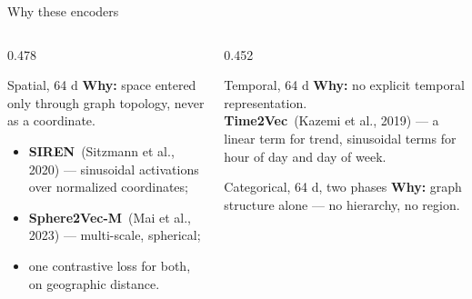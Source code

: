 \documentclass{beamer}
\begin{document}
\begin{frame}{Why these encoders}
    \begin{columns}[T,onlytextwidth]
        \begin{column}{0.478\textwidth}
            \begin{block}{Spatial, 64 d}
                \footnotesize
                \textbf{Why:} space entered only through graph topology, never as a coordinate.
                \begin{itemize}\setlength{\itemsep}{3pt}
                    \item \textbf{SIREN}~{\scriptsize(Sitzmann et al., 2020)} --- sinusoidal activations over normalized coordinates;
                    \item \textbf{Sphere2Vec-M}~{\scriptsize(Mai et al., 2023)} --- multi-scale, spherical;
                    \item one contrastive loss for both, on geographic distance.
                \end{itemize}
            \end{block}
        \end{column}
        \hfill
        \begin{column}{0.452\textwidth}
            \begin{block}{Temporal, 64 d}
                \footnotesize
                \textbf{Why:} no explicit temporal representation.\\
                \textbf{Time2Vec}~{\scriptsize(Kazemi et al., 2019)} --- a linear term for trend, sinusoidal terms for hour of day
                and day of week.
            \end{block}
            \begin{block}{Categorical, 64 d, two phases}
                \footnotesize
                \textbf{Why:} graph structure alone --- no hierarchy, no region.\\

\end{block}
\end{column}
\end{columns}
\end{frame}
\end{document}

